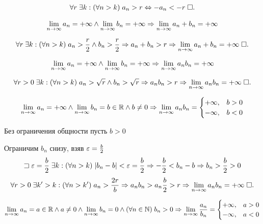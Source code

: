 \documentclass{article}
\begin{document}
\proof
\begin{align*}
	\forall r\;\exists k:(\forall n>k)\;a_{n}>r\Leftrightarrow -a_{n}<-r\;\square.
\end{align*}

\theorem
\begin{align*}
	\lim\limits_{n\to\infty} a_{n}=+\infty\land\lim\limits_{n\to\infty} b_{n}=+\infty\Rightarrow \lim\limits_{n\to\infty} a_{n}+b_{n}=+\infty
\end{align*}

\proof
\begin{align*}
	\forall r\;\exists k:(\forall n>k)\;a_{n}>\frac{r}{2}\land b_{n}>\frac{r}{2}\Rightarrow a_{n}+b_{n}>r\Rightarrow \lim\limits_{n\to\infty} a_{n}+b_{n}=+\infty\;\square.
\end{align*}

\pagebreak

\theorem
\begin{align*}
	\lim\limits_{n\to\infty} a_{n}=+\infty\land\lim\limits_{n\to\infty} b_{n}=+\infty\Rightarrow \lim\limits_{n\to\infty} a_{n}b_{n}=+\infty
\end{align*}

\proof
\begin{align*}
	\forall r>0\;\exists k:(\forall n>k)\;a_{n}>\sqrt{r}\land b_{n}>\sqrt{r}\Rightarrow a_{n}b_{n}>r\Rightarrow \lim\limits_{n\to\infty} a_{n}b_{n}=+\infty\;\square.
\end{align*}

\theorem
\begin{align*}
	\lim\limits_{n\to\infty} a_{n}=+\infty\land \lim\limits_{n\to\infty} b_{n}=b\in\mathbb{R}\land b\neq 0\Rightarrow \lim\limits_{n\to\infty} a_{n}b_{n}=
	\begin{cases}
		+\infty, & b>0 \\
		-\infty, & b<0
	\end{cases}
\end{align*}

\proof

Без ограничения общности пусть $b>0$

Ограничим $b_{n}$ снизу, взяв $\varepsilon=\frac{b}{2}$
\begin{align*}
	\sqsupset\varepsilon=\frac{b}{2}\;\exists k:(\forall n>k)\;|b_{n}-b|<\varepsilon=\frac{b}{2}\Rightarrow -\frac{b}{2}<b_{n}-b\Rightarrow b_{n}>\frac{b}{2}>0
\end{align*}
\begin{align*}
	\forall r>0\;\exists k'>k:(\forall n>k')\;a_{n}>\frac{2r}{b}\Rightarrow a_{n}b_{n}>a_{n}\frac{b}{2}>r\Rightarrow\lim\limits_{n\to\infty} a_{n}b_{n}=+\infty\;\square.
\end{align*}

\theorem
\begin{align*}
	\lim\limits_{n\to\infty} a_{n}=a\in\mathbb{R}\land a\neq 0\land\lim\limits_{n\to\infty} b_{n}=0\land (\forall n\in\mathbb{N})\;b_{n}>0\Rightarrow \lim\limits_{n\to\infty} \frac{a_{n}}{b_{n}}=
	\begin{cases}
		+\infty, & a>0 \\
		-\infty, & a<0
	\end{cases}
\end{align*}
\end{document}
